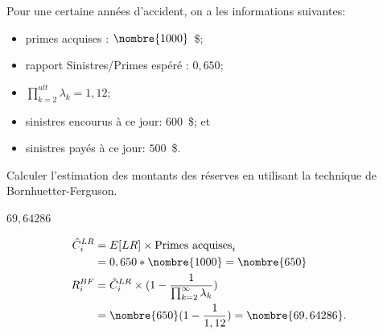 \begin{exercice}
  Pour une certaine années d'accident, on a les informations
  suivantes:
  \begin{itemize}
  \item primes acquises : $\nombre{1000}$~\$;
  \item rapport Sinistres/Primes espéré : $0,650$;
  \item $\prod_{k=2}^{ult} \lambda_k = 1,12$;
  \item sinistres encourus à ce jour: $600$~\$; et
  \item sinistres payés à ce jour: $500$~\$.
  \end{itemize}
  Calculer l'estimation des montants des réserves en utilisant la
  technique de Bornhuetter-Ferguson.
  \begin{rep}
    $69,64286$
  \end{rep}
  \begin{sol}
    \begin{align*}
      \hat{C}_{i}^{LR} &= \Esp{LR} \times \text{Primes acquises}_i\\
                       &= 0,650 * \nombre{1000} = \nombre{650} \\
      R_i^{BF} &= \hat{C}_{i}^{LR} \times ( 1 - \frac{1}{\prod_{k=2}^{\infty} \lambda_k}) \\
                       &= \nombre{650} (1-\frac{1}{1,12}) = \nombre{69,64286}.
    \end{align*}
  \end{sol}
\end{exercice}

